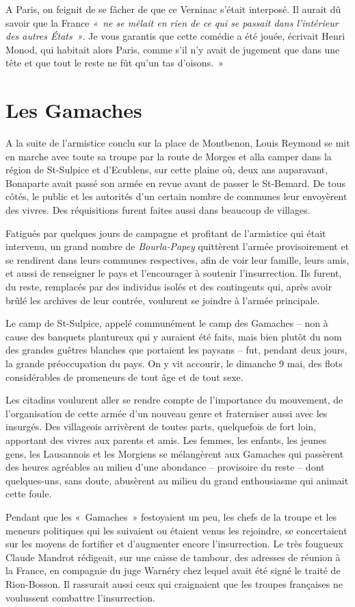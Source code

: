 \documentclass[french,twoside]{book} %
\begin{document}
\noindent A Paris, on feignit de se fâcher de que ce Verninac s’était interposé. Il aurait dû savoir que la France \emph{« ne se mêlait en rien de ce qui se passait dans l’intérieur des autres États »}. Je vous garantis que cette comédie a été jouée, écrivait Henri Monod, qui habitait alors Paris, comme s’il n’y avait de jugement que dans une tête et que tout le reste ne fût qu’un tas d’oisons. »
\section[Les Gamaches]{Les Gamaches}
\noindent A la suite de l’armistice conclu sur la place de Montbenon, Louis Reymond se mit en marche avec toute sa troupe par la route de Morges et alla camper dans la région de St-Sulpice et d’Ecublens, sur cette plaine où, deux ans auparavant, Bonaparte avait passé son armée en revue avant de passer le St-Bemard. De tous côtés, le public et les autorités d’un certain nombre de communes leur envoyèrent des vivres. Des réquisitions furent faites aussi dans beaucoup de villages.\par
Fatigués par quelques jours de campagne et profitant de l’armistice qui était intervenu, un grand nombre de \emph{Bourla-Papey} quittèrent l’armée provisoirement et se rendirent dans leurs communes respectives, afin de voir leur famille, leurs amis, et aussi de renseigner le pays et l’encourager à soutenir l’insurrection. Ils furent, du reste, remplacés par des individus isolés et des contingents qui, après avoir brûlé les archives de leur contrée, voulurent se joindre à l’armée principale.\par
Le camp de St-Sulpice, appelé communément le camp des Gamaches – non à cause des banquets plantureux qui y auraient été faits, mais bien plutôt du nom des grandes guêtres blanches que portaient les paysans – fut, pendant deux jours, la grande préoccupation du pays. On y vit accourir, le dimanche 9 mai, des flots considérables de promeneurs de tout âge et de tout sexe.\par
Les citadins voulurent aller se rendre compte de l’importance du mouvement, de l’organisation de cette armée d’un nouveau genre et fraterniser aussi avec les insurgés. Des villageois arrivèrent de toutes parts, quelquefois de fort loin, apportant des vivres aux parents et amis. Les femmes, les enfants, les jeunes gens, les Lausannois et les Morgiens se mélangèrent aux Gamaches qui passèrent des heures agréables au milieu d’une abondance – provisoire du reste – dont quelques-uns, sans doute, abusèrent au milieu du grand enthousiasme qui animait cette foule.\par
Pendant que les « Gamaches » festoyaient un peu, les chefs de la troupe et les meneurs politiques qui les suivaient ou étaient venus les rejoindre, se concertaient sur les moyens de fortifier et d’augmenter encore l’insurrection. Le très fougueux Claude Mandrot rédigeait, sur une caisse de tambour, des adresses de réunion à la France, en compagnie du juge Warnéry chez lequel avait été signé le traité de Rion-Bosson. Il rassurait aussi ceux qui craignaient que les troupes françaises ne voulussent combattre l’insurrection.\par
\end{document}
